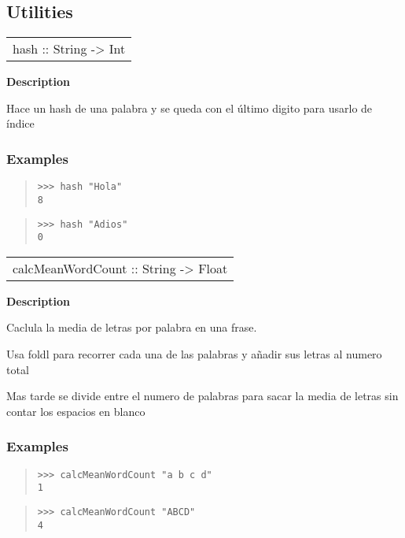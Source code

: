 \subsection{Utilities}
\begin{haddockdesc}
\item[\begin{tabular}{@{}l}
hash :: String -> Int
\end{tabular}]
{\haddockbegindoc
\textbf{Description}\par
Hace un hash de una palabra y se queda con el último digito para usarlo de índice\par
\subsubsection*{\textbf{Examples}}
\begin{quote}
{\haddockverb\begin{verbatim}
>>> hash "Hola"
8

\end{verbatim}}
\end{quote}
\begin{quote}
{\haddockverb\begin{verbatim}
>>> hash "Adios"
0

\end{verbatim}}
\end{quote}}
\end{haddockdesc}
\begin{haddockdesc}
\item[\begin{tabular}{@{}l}
calcMeanWordCount :: String -> Float
\end{tabular}]
{\haddockbegindoc
\textbf{Description}\par
Caclula la media de letras por palabra en una frase.\par
Usa foldl para recorrer cada una de las palabras y añadir sus letras al numero total\par
Mas tarde se divide entre el numero de palabras para sacar la media de letras sin contar los espacios en blanco\par
\subsubsection*{\textbf{Examples}}
\begin{quote}
{\haddockverb\begin{verbatim}
>>> calcMeanWordCount "a b c d"
1

\end{verbatim}}
\end{quote}
\begin{quote}
{\haddockverb\begin{verbatim}
>>> calcMeanWordCount "ABCD"
4

\end{verbatim}}
\end{quote}}
\end{haddockdesc}
